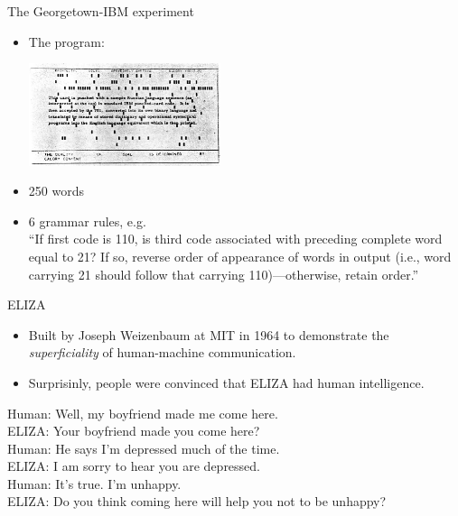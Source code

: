 \documentclass[usenames,dvipsnames,notes]{beamer}
\begin{document}
\begin{frame}
    {The Georgetown-IBM experiment}
    \begin{itemize}
        \item The program:\\
            \begin{center}
            \includegraphics[height=3cm]{figures/ibm-experiment}
            \end{center}
        \item 250 words
        \item 6 grammar rules, e.g.\\
            ``If first code is 110, is third code associated with preceding complete word equal to 21? If so, reverse order of appearance of words in output (i.e., word carrying 21 should follow that carrying 110)---otherwise, retain order.''
    \end{itemize}
\end{frame}

\begin{frame}
    {ELIZA}
    \begin{itemize}
        \item Built by Joseph Weizenbaum at MIT in 1964 to demonstrate the \emph{superficiality} of human-machine communication.
        \item Surprisinly, people were convinced that ELIZA had human intelligence.
    \end{itemize}
    \bigskip
    \centering
    \begin{simpleblock}{}
    Human: Well, my boyfriend made me come here.\\
    ELIZA: Your boyfriend made you come here?\\
    Human: He says I'm depressed much of the time.\\
    ELIZA: I am sorry to hear you are depressed.\\
    Human: It's true. I'm unhappy.\\
    ELIZA: Do you think coming here will help you not to be unhappy?
    \end{simpleblock}
\end{frame}
\end{document}
